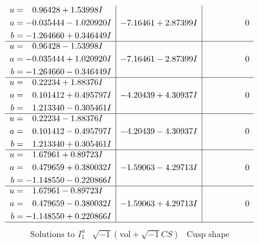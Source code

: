 \documentclass[1p]{elsarticle_modified}
\theoremstyle{definition}
\newcommand{\I}{\sqrt{-1}}
\begin{document}
$$\begin{array}{c|c|c}
\begin{aligned}
u &= \phantom{-}0.96428 + 1.53998 I \\
a &= -0.035444 - 1.020920 I \\
b &= -1.264660 + 0.346449 I\end{aligned}
 & -7.16461 + 2.87399 I & \phantom{-0.000000 } 0 \\ \hline\begin{aligned}
u &= \phantom{-}0.96428 - 1.53998 I \\
a &= -0.035444 + 1.020920 I \\
b &= -1.264660 - 0.346449 I\end{aligned}
 & -7.16461 - 2.87399 I & \phantom{-0.000000 } 0 \\ \hline\begin{aligned}
u &= \phantom{-}0.22234 + 1.88376 I \\
a &= \phantom{-}0.101412 + 0.495797 I \\
b &= \phantom{-}1.213340 - 0.305461 I\end{aligned}
 & -4.20439 + 4.30937 I & \phantom{-0.000000 } 0 \\ \hline\begin{aligned}
u &= \phantom{-}0.22234 - 1.88376 I \\
a &= \phantom{-}0.101412 - 0.495797 I \\
b &= \phantom{-}1.213340 + 0.305461 I\end{aligned}
 & -4.20439 - 4.30937 I & \phantom{-0.000000 } 0 \\ \hline\begin{aligned}
u &= \phantom{-}1.67961 + 0.89723 I \\
a &= \phantom{-}0.479659 + 0.380032 I \\
b &= -1.148550 - 0.220866 I\end{aligned}
 & -1.59063 - 4.29713 I & \phantom{-0.000000 } 0 \\ \hline\begin{aligned}
u &= \phantom{-}1.67961 - 0.89723 I \\
a &= \phantom{-}0.479659 - 0.380032 I \\
b &= -1.148550 + 0.220866 I\end{aligned}
 & -1.59063 + 4.29713 I & \phantom{-0.000000 } 0\\
 \hline 
 \end{array}$$\newpage$$\begin{array}{c|c|c}  
\text{Solutions to }I^u_{1}& \I (\text{vol} + \sqrt{-1}CS) & \text{Cusp shape}\\
 \hline 
\begin{aligned}

\end{aligned}
\end{array}$$
\end{document}
